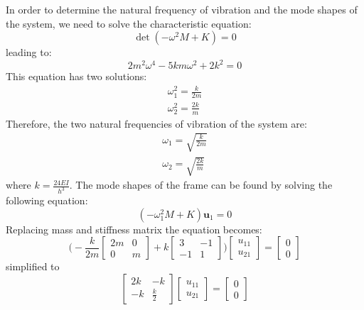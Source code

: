 \documentclass[12pt,letter]{article}
\begin{document}
\begin{example}
\pagebreak

In order to determine the natural frequency of vibration and the mode shapes of the system, we need to solve the characteristic equation:
\begin{equation}
\det(-\omega^2 M  + K) = 0
\end{equation}
leading to:
\begin{equation}
2m^2 \omega^4 - 5 k m \omega^2 + 2 k^2 = 0
\end{equation}
This equation has two solutions:
\begin{eqnarray}
\omega_1^2 = \frac{k}{2 m}\\
\omega_2^2 = \frac{2 k}{m}
\end{eqnarray}
Therefore, the two natural frequencies of vibration of the system are:
\begin{eqnarray}
\omega_1 = \sqrt{\frac{k}{2 m}}\\
\omega_2 = \sqrt{\frac{2 k}{m}}
\end{eqnarray}
where $k = \frac{24EI}{h^3}$. The mode shapes of the frame can be found by solving the following equation:
\begin{equation}
(-\omega_1^2 M  + K)\mathbf{u}_1 =0
\end{equation}
Replacing mass and stiffness matrix the equation becomes:
\begin{equation}
\bigg(-\frac{k}{2 m}\begin{bmatrix}  2m & 0 \\   0  & m \end{bmatrix} + k \begin{bmatrix} 3 & -1 \\    -1  & 1 \end{bmatrix}\bigg)\begin{bmatrix} u_{11}\\ u_{21}\end{bmatrix} = \begin{bmatrix} 0\\ 0\end{bmatrix}
\end{equation}
simplified to
\begin{equation}
\begin{bmatrix} 2k & -k \\    -k  & \frac{k}{2} \end{bmatrix} 
\begin{bmatrix} u_{11}\\ u_{21}\end{bmatrix}=\begin{bmatrix} 0\\ 0\end{bmatrix}

\end{equation}
\end{example}
\end{document}
